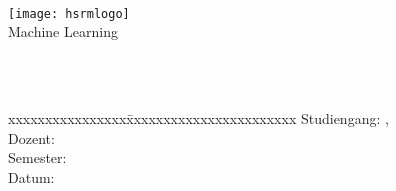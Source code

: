 \begin{center}

	\vspace{2.2cm}
	{\large \textbf{\university}}\\
	\vspace{2cm}
	
	\texttt{[image: hsrmlogo]}\\
	\vspace{2.8cm}	
	{\small Machine Learning}\\ 
	\vspace{1cm}
	\doublespacing
	{\Huge \textbf{\reporttitle}}\\ 
	\singlespacing 
	\vspace{1cm}
	\vspace{2.2cm}
	\onehalfspacing
	  
	  {\textbf{\students}}\\
	  
	\begin{tabbing}
		xxxxxxxxxxxxxxxx\=xxxxxxxxxxxxxxxxxxxxxxx\kill
		Studiengang: \> \studiengang, \degree\\
		Dozent: \> \prof \\
		{Semester}: \> \reportsemester  \\
		{Datum:} \> \handoverdate \\
	\end{tabbing}
	\singlespacing 

\end{center}  
